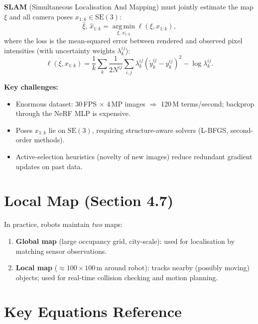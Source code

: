 \documentclass[12pt, a4paper]{article}
\begin{document}
\textbf{SLAM} (Simultaneous Localisation And Mapping) must jointly
estimate the map $\xi$ and all camera poses $x_{1:k}\in\mathrm{SE}(3)$:
\begin{equation}
  \hat{\xi},\,\hat{x}_{1:k} = \operatorname*{arg\,min}_{\xi,\,x_{1:k}}
  \ell(\xi, x_{1:k}),
  \label{eq:slam_obj}
\end{equation}
where the loss is the mean-squared error between rendered and observed
pixel intensities (with uncertainty weights $\lambda_k^{ij}$):
\begin{equation}
  \ell(\xi,x_{1:k}) = \frac{1}{k}\sum_{k}\frac{1}{2N^{ij}}\sum_{i,j}\lambda_k^{ij}
  \left(\tilde{y}_k^{ij}-y_k^{ij}\right)^2 - \log\lambda_k^{ij}.
\end{equation}

\textbf{Key challenges:}
\begin{itemize}
  \item Enormous dataset: 30\,FPS $\times$ 4\,MP images $\Rightarrow$
    120\,M terms/second; backprop through the NeRF MLP is expensive.
  \item Poses $x_{1:k}$ lie on $\mathrm{SE}(3)$, requiring
    structure-aware solvers (L-BFGS, second-order methods).
  \item Active-selection heuristics (novelty of new images) reduce
    redundant gradient updates on past data.
\end{itemize}

\section{Local Map (Section 4.7)}

In practice, robots maintain \emph{two} maps:
\begin{enumerate}
  \item \textbf{Global map} (large occupancy grid, city-scale): used for
    localisation by matching sensor observations.
  \item \textbf{Local map} ($\approx 100\times100$\,m around robot):
    tracks nearby (possibly moving) objects; used for real-time
    collision checking and motion planning.
\end{enumerate}

\section{Key Equations Reference}
\end{document}
